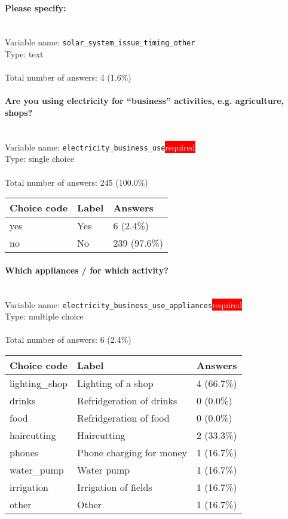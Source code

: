 \documentclass[11.5pt, a4paper]{scrartcl}
\begin{document}
\paragraph{Please specify:}
\  \\Variable name: \texttt{solar\_system\_issue\_timing\_other}\\
Type: text\\
\\Total number of answers: 4 (1.6\%)
\\[0.2em]\paragraph{Are you using electricity for “business” activities, e.g. agriculture, shops?}
\  \\Variable name: \texttt{electricity\_business\_use}\hfill\colorbox{red}{\small{\textcolor{white}{required}}}\\
 Type: single choice\\
\\Total number of answers: 245 (100.0\%)
\\[0.2em] \begin{tabular}{p{4cm}|p{8cm}|p{3cm}}
Choice code & Label & Answers \\
\hline
yes & Yes& \cellcolor{color0}6 (2.4\%)\\
\cellcolor{mygray} no & \cellcolor{mygray}No & \cellcolor{color4}239 (97.6\%)\\
\end{tabular}
\paragraph{Which appliances / for which activity?}
\  \\Variable name: \texttt{electricity\_business\_use\_appliances}\hfill\colorbox{red}{\small{\textcolor{white}{required}}}\\
 Type: multiple choice\\
\\Total number of answers: 6 (2.4\%)
\\[0.2em] \begin{tabular}{p{4cm}|p{8cm}|p{3cm}}
Choice code & Label & Answers \\
\hline
lighting\_shop & Lighting of a shop & \cellcolor{color3}4 (66.7\%)\\
\cellcolor{mygray} drinks & \cellcolor{mygray}Refridgeration of drinks & \cellcolor{color0}0 (0.0\%)\\
food & Refridgeration of food& \cellcolor{color0}0 (0.0\%)\\
\cellcolor{mygray} haircutting & \cellcolor{mygray}Haircutting & \cellcolor{color1}2 (33.3\%)\\
phones & Phone charging for money& \cellcolor{color0}1 (16.7\%)\\
\cellcolor{mygray} water\_pump & \cellcolor{mygray}Water pump & \cellcolor{color0}1 (16.7\%)\\
irrigation & Irrigation of fields& \cellcolor{color0}1 (16.7\%)\\
\cellcolor{mygray} other & \cellcolor{mygray}Other  & \cellcolor{color0}1 (16.7\%)\\
\end{tabular}
\end{document}
